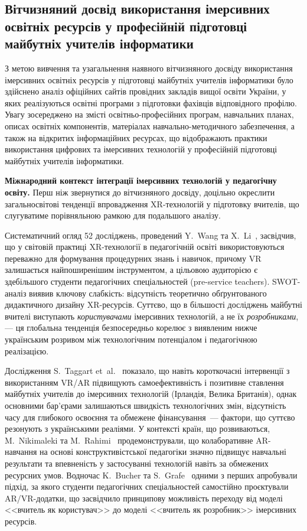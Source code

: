 \subsection{Вітчизняний досвід використання імерсивних освітніх ресурсів у професійній підготовці майбутніх учителів інформатики}\label{subsec:1.3}

З метою вивчення та узагальнення наявного вітчизняного досвіду використання імерсивних освітніх ресурсів у підготовці майбутніх учителів інформатики було здійснено аналіз офіційних сайтів провідних закладів вищої освіти України, у яких реалізуються освітні програми з підготовки фахівців відповідного профілю. Увагу зосереджено на змісті освітньо-професійних програм, навчальних планах, описах освітніх компонентів, матеріалах навчально-методичного забезпечення, а також на відкритих інформаційних ресурсах, що відображають практики використання цифрових та імерсивних технологій у професійній підготовці майбутніх учителів інформатики.

\textbf{Міжнародний контекст інтеграції імерсивних технологій у педагогічну освіту.} Перш ніж звернутися до вітчизняного досвіду, доцільно окреслити загальносвітові тенденції впровадження XR-технологій у підготовку вчителів, що слугуватиме порівняльною рамкою для подальшого аналізу.

Систематичний огляд 52 досліджень, проведений Y.~Wang та X.~Li~\cite{Angelov2025Synergy}, засвідчив, що у світовій практиці XR-технології в педагогічній освіті використовуються переважно для формування процедурних знань і навичок, причому VR залишається найпоширенішим інструментом, а цільовою аудиторією є здебільшого студенти педагогічних спеціальностей (pre-service teachers). SWOT-аналіз виявив ключову слабкість: відсутність теоретично обґрунтованого дидактичного дизайну XR-ресурсів. Суттєво, що в більшості досліджень майбутні вчителі виступають \emph{користувачами} імерсивних технологій, а не їх \emph{розробниками}, --- ця глобальна тенденція безпосередньо корелює з виявленим нижче українським розривом між технологічним потенціалом і педагогічною реалізацією.

Дослідження S.~Taggart et~al.~\cite{Taggart2023Makers} показало, що навіть короткочасні інтервенції з використанням VR/AR підвищують самоефективність і позитивне ставлення майбутніх учителів до імерсивних технологій (Ірландія, Велика Британія), однак основними бар'єрами залишаються швидкість технологічних змін, відсутність часу для глибокого освоєння та обмежене фінансування~--- фактори, що суттєво резонують з українськими реаліями. У контексті країн, що розвиваються, M.~Nikimaleki та M.~Rahimi~\cite{Nikimaleki2022CollaborativeAR} продемонстрували, що колаборативне AR-навчання на основі конструктивістської педагогіки значно підвищує навчальні результати та впевненість у застосуванні технологій навіть за обмежених ресурсних умов. Водночас K.~Bucher та S.~Grafe~\cite{Bucher2018DesigningARVR} одними з перших апробували підхід, за якого студенти педагогічних спеціальностей самостійно проєктували AR/VR-додатки, що засвідчило принципову можливість переходу від моделі <<вчитель як користувач>> до моделі <<вчитель як розробник>> імерсивних ресурсів.

